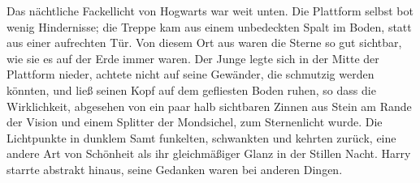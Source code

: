 Das nächtliche Fackellicht von Hogwarts war weit unten. Die Plattform selbst bot
wenig Hindernisse; die Treppe kam aus einem unbedeckten Spalt im Boden, statt
aus einer aufrechten Tür. Von diesem Ort aus waren die Sterne so gut sichtbar,
wie sie es auf der Erde immer waren. Der Junge legte sich in der Mitte der
Plattform nieder, achtete nicht auf seine Gewänder, die schmutzig werden
könnten, und ließ seinen Kopf auf dem gefliesten Boden ruhen, so dass die
Wirklichkeit, abgesehen von ein paar halb sichtbaren Zinnen aus Stein am Rande
der Vision und einem Splitter der Mondsichel, zum Sternenlicht wurde. Die
Lichtpunkte in dunklem Samt funkelten, schwankten und kehrten zurück, eine
andere Art von Schönheit als ihr gleichmäßiger Glanz in der Stillen Nacht. Harry
starrte abstrakt hinaus, seine Gedanken waren bei anderen Dingen.


